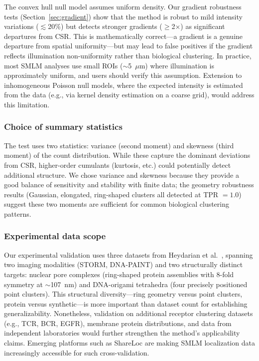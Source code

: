 \documentclass[11pt]{article}
\begin{document}
The convex hull null model assumes uniform density. Our gradient
robustness tests (Section~\ref{sec:gradient}) show that the method is
robust to mild intensity variations ($\lesssim$20\%) but detects
stronger gradients ($\geq$2$\times$) as significant departures from CSR.
This is mathematically correct---a gradient is a genuine departure from
spatial uniformity---but may lead to false positives if the gradient
reflects illumination non-uniformity rather than biological clustering.
In practice, most SMLM analyses use small ROIs ($\sim$5~$\mu$m) where
illumination is approximately uniform, and users should verify this
assumption. Extension to inhomogeneous Poisson null models, where the
expected intensity is estimated from the data (e.g., via kernel density
estimation on a coarse grid), would address this limitation.

\subsubsection{Choice of summary statistics}

The test uses two statistics: variance (second moment) and skewness
(third moment) of the count distribution. While these capture the
dominant deviations from CSR, higher-order cumulants (kurtosis, etc.)
could potentially detect additional structure. We chose variance and
skewness because they provide a good balance of sensitivity and stability
with finite data; the geometry robustness results (Gaussian, elongated,
ring-shaped clusters all detected at TPR $= 1.0$) suggest these two
moments are sufficient for common biological clustering patterns.

\subsubsection{Experimental data scope}

Our experimental validation uses three datasets from Heydarian et al.\
\citep{heydarian2021}, spanning two imaging modalities (STORM,
DNA-PAINT) and two structurally distinct targets: nuclear pore complexes
(ring-shaped protein assemblies with 8-fold symmetry at $\sim$107~nm)
and DNA-origami tetrahedra (four precisely positioned point clusters).
This structural diversity---ring geometry versus point clusters, protein
versus synthetic---is more important than dataset count for establishing
generalizability. Nonetheless, validation on additional receptor
clustering datasets (e.g., TCR, BCR, EGFR), membrane protein
distributions, and data from independent laboratories would further
strengthen the method's applicability claims. Emerging platforms such as
ShareLoc \citep{shareloc2022} are making SMLM localization data
increasingly accessible for such cross-validation.
\end{document}
